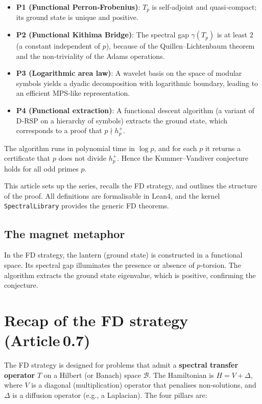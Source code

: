 \documentclass[11pt,a4paper]{article}
\begin{document}
\begin{itemize}
\item \textbf{P1 (Functional Perron‑Frobenius)}: $T_p$ is self‑adjoint and quasi‑compact; its ground state is unique and positive.
\item \textbf{P2 (Functional Kithima Bridge)}: The spectral gap $\gamma(T_p)$ is at least $2$ (a constant independent of $p$), because of the Quillen–Lichtenbaum theorem and the non‑triviality of the Adams operations.
\item \textbf{P3 (Logarithmic area law)}: A wavelet basis on the space of modular symbols yields a dyadic decomposition with logarithmic boundary, leading to an efficient MPS‑like representation.
\item \textbf{P4 (Functional extraction)}: A functional descent algorithm (a variant of D‑RSP on a hierarchy of symbols) extracts the ground state, which corresponds to a proof that $p \nmid h_p^+$.
\end{itemize}

The algorithm runs in polynomial time in $\log p$, and for each $p$ it returns a certificate that $p$ does not divide $h_p^+$. Hence the Kummer–Vandiver conjecture holds for all odd primes $p$.

This article sets up the series, recalls the FD strategy, and outlines the structure of the proof. All definitions are formalisable in Lean4, and the kernel \texttt{SpectralLibrary} provides the generic FD theorems.

\subsection{The magnet metaphor}

In the FD strategy, the lantern (ground state) is constructed in a functional space. Its spectral gap illuminates the presence or absence of $p$‑torsion. The algorithm extracts the ground state eigenvalue, which is positive, confirming the conjecture.

\section{Recap of the FD strategy (Article 0.7)}

The FD strategy is designed for problems that admit a \textbf{spectral transfer operator} $T$ on a Hilbert (or Banach) space $\mathcal{B}$. The Hamiltonian is $H = V + \Delta$, where $V$ is a diagonal (multiplication) operator that penalises non‑solutions, and $\Delta$ is a diffusion operator (e.g., a Laplacian). The four pillars are:
\end{document}
